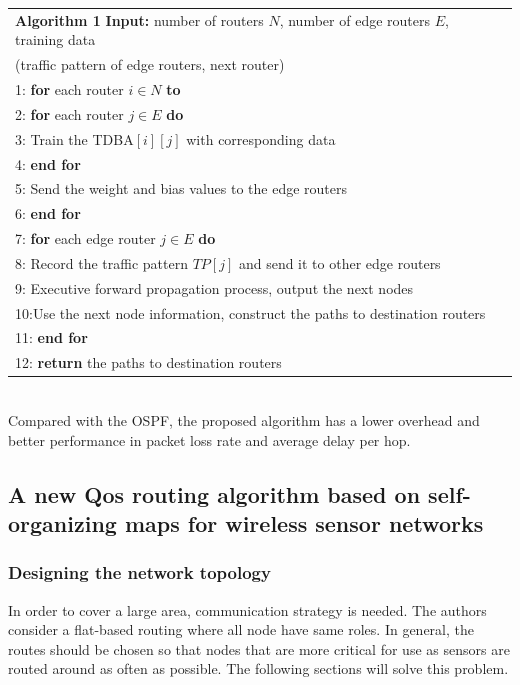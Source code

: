 \documentclass[11pt]{report}
\begin{document}
	\begin{tabular}{lc}
		\toprule
		\textbf{Algorithm 1}
		\textbf{Input:} number of routers $N$, number of edge routers $E$, training data\\ (traffic pattern of edge routers, next router)\\
		\hline
		1: \textbf{for} each router $i\in N$ \textbf{to}\\
		2: \quad \textbf{for} each router $j\in E$ \textbf{do}\\
		3: \qquad Train the TDBA$\left[i\right]\left[j\right]$ with corresponding data\\
		4: \quad\textbf{end for}\\
		5: \quad Send the weight and bias values to the edge routers\\
		6: \textbf{end for}\\
		7: \textbf{for} each edge router $j\in E$ \textbf{do}\\
		8: \quad Record the traffic pattern $TP\left[j\right]$ and send it to other edge routers\\
		9: \quad Executive forward propagation process, output the next nodes\\
		10:\quad Use the next node information, construct the paths to destination routers\\
		11: \textbf{end for}\\
		12: \textbf{return} the paths to destination routers\\
		\hline
	\end{tabular}\\

	\noindent Compared with the OSPF, the proposed algorithm has a lower overhead and better performance in packet loss rate and average delay per hop.
	
	\subsection{A new Qos routing algorithm based on self-organizing maps for wireless sensor networks}
	\subsubsection{Designing the network topology}
	
	
	In order to cover a large area, communication strategy is needed. The authors consider a flat-based routing where all node have same roles. In general, the routes should be chosen so that nodes that are more critical for use as sensors are routed around as often as possible. The following sections will solve this problem.
	
\end{document}
